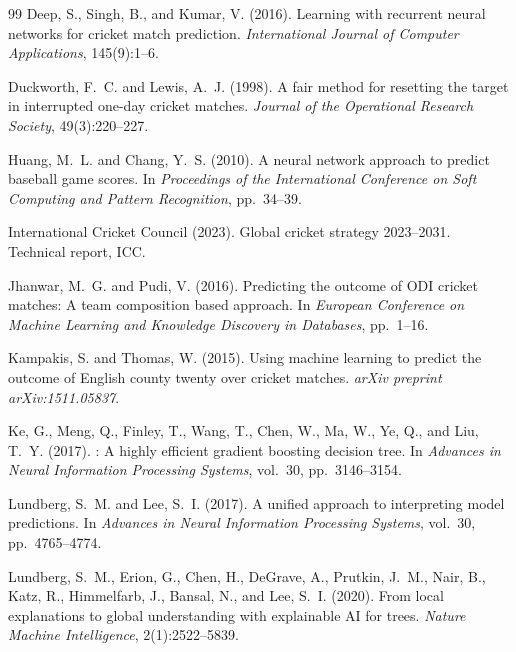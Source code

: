 \documentclass[12pt,a4paper,oneside]{report}
\begin{document}
\begin{thebibliography}{99}
Deep, S., Singh, B., and Kumar, V. (2016).
\newblock Learning with recurrent neural networks for cricket match prediction.
\newblock \emph{International Journal of Computer Applications}, 145(9):1--6.

Duckworth, F.~C. and Lewis, A.~J. (1998).
\newblock A fair method for resetting the target in interrupted one-day cricket matches.
\newblock \emph{Journal of the Operational Research Society}, 49(3):220--227.

Huang, M.~L. and Chang, Y.~S. (2010).
\newblock A neural network approach to predict baseball game scores.
\newblock In \emph{Proceedings of the International Conference on Soft Computing and Pattern Recognition}, pp.~34--39.

{International Cricket Council} (2023).
\newblock Global cricket strategy 2023--2031.
\newblock Technical report, ICC.

Jhanwar, M.~G. and Pudi, V. (2016).
\newblock Predicting the outcome of ODI cricket matches: A team composition based approach.
\newblock In \emph{European Conference on Machine Learning and Knowledge Discovery in Databases}, pp.~1--16.

Kampakis, S. and Thomas, W. (2015).
\newblock Using machine learning to predict the outcome of English county twenty over cricket matches.
\newblock \emph{arXiv preprint arXiv:1511.05837}.

Ke, G., Meng, Q., Finley, T., Wang, T., Chen, W., Ma, W., Ye, Q., and Liu, T.~Y. (2017).
: A highly efficient gradient boosting decision tree.
\newblock In \emph{Advances in Neural Information Processing Systems}, vol.~30, pp.~3146--3154.

Lundberg, S.~M. and Lee, S.~I. (2017).
\newblock A unified approach to interpreting model predictions.
\newblock In \emph{Advances in Neural Information Processing Systems}, vol.~30, pp.~4765--4774.

Lundberg, S.~M., Erion, G., Chen, H., DeGrave, A., Prutkin, J.~M., Nair, B., Katz, R., Himmelfarb, J., Bansal, N., and Lee, S.~I. (2020).
\newblock From local explanations to global understanding with explainable {AI} for trees.
\newblock \emph{Nature Machine Intelligence}, 2(1):2522--5839.


\end{thebibliography}
\end{document}

